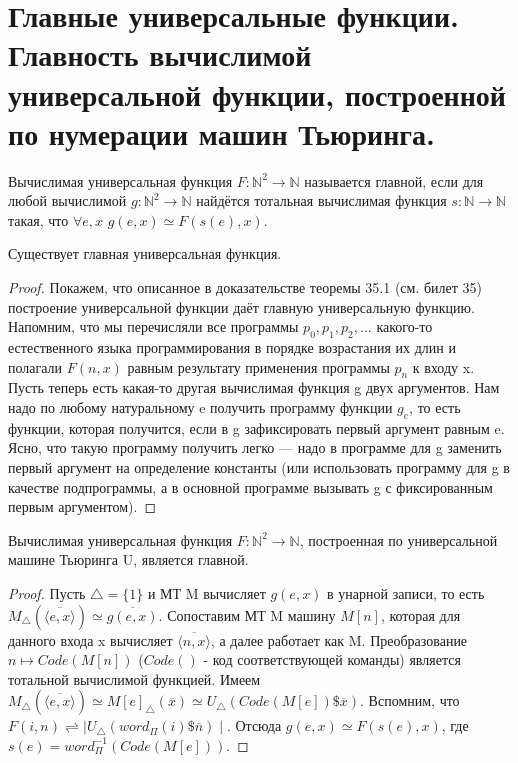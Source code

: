 \section{Главные универсальные функции. Главность вычислимой универсальной функции, построенной по нумерации машин
Тьюринга.}

\begin{definition}
	Вычислимая универсальная функция $F:\mathbb{N}^2 \rightarrow \mathbb{N}$ называется главной, если для любой
	вычислимой $g:\mathbb{N}^2 \rightarrow \mathbb{N}$ найдётся тотальная вычислимая функция $s:\mathbb{N}
	\rightarrow \mathbb{N}$ такая, что $\forall e,x$ $g(e,x) \simeq F(s(e),x)$.
\end{definition}

\begin{theorem}
	Существует главная универсальная функция.
\end{theorem}
\begin{proof}
	Покажем, что описанное в доказательстве теоремы 35.1 (см. билет 35) построение универсальной функции даёт
	главную универсальную функцию. Напомним, что мы перечисляли все программы $p_0, p_1, p_2,...$ какого-то
	естественного языка программирования в порядке возрастания их длин и полагали $F(n,x)$ равным результату
	применения программы $p_n$ к входу x. Пусть теперь есть какая-то другая вычислимая функция g двух аргументов.
	Нам надо по любому натуральному e получить программу функции $g_e$, то есть функции, которая получится, если в
	g зафиксировать первый аргумент равным e. Ясно, что такую программу получить легко — надо в программе для g
	заменить первый аргумент на определение константы (или использовать программу для g в качестве подпрограммы, а
	в основной программе вызывать g с фиксированным первым аргументом).
\end{proof}

\begin{theorem}
	Вычислимая универсальная функция $F:\mathbb{N}^2 \rightarrow \mathbb{N}$, построенная по универсальной машине
	Тьюринга U, является главной.
\end{theorem}
\begin{proof}
	Пусть $\bigtriangleup = \{1\}$ и МТ M вычисляет $g(e,x)$ в унарной записи, то есть $M_\bigtriangleup
	(\overline{\langle e,x \rangle}) \simeq \overline{g(e,x)}$. Сопоставим МТ M машину $M[n]$, которая для данного
	входа x вычисляет $\overline{\langle n,x \rangle}$, а далее работает как M. Преобразование $n \mapsto
	Code(M[n])$ ($Code()$ - код соответствующей команды) является тотальной вычислимой функцией.
	Имеем $M_\bigtriangleup (\overline{\langle e,x \rangle}) \simeq M[e]_\bigtriangleup (\overline{x}) \simeq
	U_\bigtriangleup (Code(M[e]) \$ \overline{x}) $. Вспомним, что $F(i,n) \rightleftharpoons \mid U_\bigtriangleup
	(word_{\Pi} (i) \$ \overline{n}) \mid $. Отсюда $g(e,x) \simeq F(s(e),x)$, где $s(e) = word_{\Pi}^{-1}
	(Code(M[e])) $.

\end{proof}
